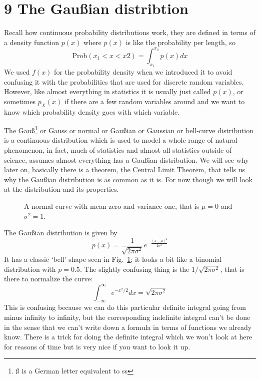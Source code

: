 \documentclass[11pt,a4paper]{scrartcl}
\begin{document}
\section*{9 The Gau\ss{}ian distribtion}

Recall how continuous probability distributions work, they are defined
in terms of a density function $p(x)$ where $p(x)$ is like the
probability per length, so 
\begin{equation}
\mbox{Prob}(x_1<x<x2)=\int_{x_1}^{x_2} p(x)dx
\end{equation}
We used $f(x)$ for the probability density when we introduced it to
avoid confusing it with the probabilities that are used for discrete
random variables. However, like almost everything in statistics it is
usually just called $p(x)$, or sometimes $p_X(x)$ if there are a few
random variables around and we want to know which probability density
goes with which variable.

The Gau\ss\footnote{\ss{} is a German letter equivalent to ss} or Gauss
or normal or Gau\ss{}ian or Gaussian or bell-curve distribution is a
continuous distribution which is used to model a whole range of
natural phenomenon, in fact, much of statistics and almost all
statistics outside of science, assumes almost everything has a
Gau\ss{}ian distribution. We will see why later on, basically there is
a theorem, the Central Limit Theorem, that tells us why the
Gau\ss{}ian distribution is as common as it is. For now though we will
look at the distribution and its properties.

\begin{figure}[tb]
\begin{center}

\end{center}
\caption{A normal curve with mean zero and variance one, that is $\mu=0$ and $\sigma^2=1$.\label{fig_gauss}}
\end{figure}

The Gau\ss{}ian distribution is given by
\begin{equation}
p(x)=\frac{1}{\sqrt{2\pi\sigma^2}}e^{-\frac{(x-\mu)^2}{2\sigma^2}}
\end{equation}
It has a classic \lq{}bell\rq{} shape seen in Fig.~\ref{fig_gauss}; it
looks a bit like a binomial distribution with $p=0.5$. The slightly
confusing thing is the $1/\sqrt{2\pi\sigma^2}$, that is there to normalize the curve:
\begin{equation}
\int_{-\infty}^\infty e^{-x^2/2}dx=\sqrt{2\pi\sigma^2}
\end{equation}
This is confusing because we can do this particular definite integral
going from minus infinity to infinity, but the corresponding
indefinite integral can't be done in the sense that we can't write
down a formula in terms of functions we already know. There is a trick
for doing the definite integral which we won't look at here for
reasons of time but is very nice if you want to look it up.
\end{document}
